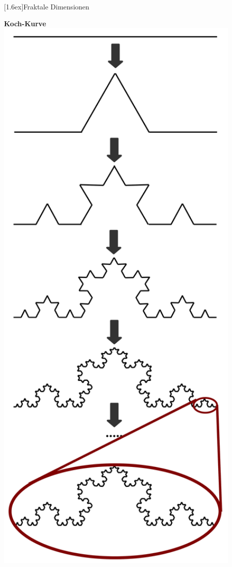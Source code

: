 \documentclass[final]{beamer}
\newlength{\columnheight}
\newlength{\marginw}
\newlength{\tw}
\newlength{\colw}
\newenvironment{myTwoColPoster}{%
  \begin{minipage}[t]{\textwidth}%
    \hspace*{\marginw}%
    \hspace*{9.5bp}%
    \begin{minipage}[t]{\tw}}%
  {\end{minipage}%
   \hspace*{\marginw}%
   \end{minipage}}
\newenvironment{myCol}%
    {\begin{minipage}[t][\columnheight][t]{\colw}}%
    {\end{minipage}}
\newenvironment{textblock}[1]%
    {\begin{block}{\rule[-0.6ex]{0pt}{2.4ex}\raisebox{-0.25ex}[1.6ex]{#1}}%
     \vspace*{5mm}}%
    {\vspace*{5mm}\end{block}}
\begin{document}
\begin{frame}[t]{}
\begin{myTwoColPoster}
\begin{myCol}
\begin{textblock}{Fraktale Dimensionen}
  \begin{minipage}[t]{0.38\textwidth}
    \begin{center}
      \textbf{Koch-Kurve}\\[1cm]
      \includegraphics[width=0.9\textwidth]{fig/Koch3}

\end{center}
\end{minipage}
\end{textblock}
\end{myCol}
\end{myTwoColPoster}
\end{frame}
\end{document}
